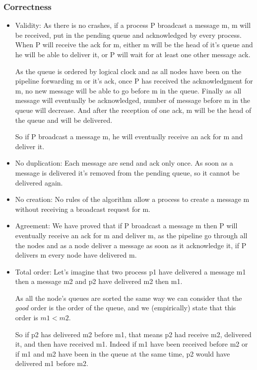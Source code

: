 \documentclass[a4paper]{article}
\begin{document}
\subsubsection*{Correctness}
\begin{itemize}
    \item Validity: As there  is no crashes, if a process P broadcast a
        message m, m will be received, put in the pending queue and acknowledged 
        by every process. When P will receive the ack for m, either m will be
        the head of it's queue and he will be able to deliver it, or P will wait
        for at least one other message ack. 
        
        As the queue is ordered by logical clock and as all nodes have been on
        the pipeline forwarding m or it's ack, once P has received the
        acknowledgment for m, no new message will be able to go before m in the
        queue. Finally as all message will eventually be acknowledged, number of
        message before m in the queue will decrease. And after the reception of
        one ack, m will be the head of the queue and will be delivered.

        So if P broadcast a message m, he will eventually receive an ack
        for m and deliver it.
    \item No duplication: Each message are send and ack only once. As soon as a
        message is delivered it's removed from the pending queue, so it cannot
        be delivered again.
    \item No creation: No rules of the algorithm allow a process to
        create a message m without receiving a broadcast request for m.
    \item Agreement: We have proved that if P broadcast a message m
        then P will eventually receive an ack for m and deliver m, as
        the pipeline go through all the nodes and as a node deliver a
        message as soon as it acknowledge it, if P delivers m every node
        have delivered m.
    \item Total order: Let's imagine that two process p1 have delivered a message m1 then a
        message m2 and p2 have delivered m2 then m1. 
        
        As all the node's queues are sorted the same way we can consider that
        the \textit{good} order is the order of the queue, and we (empirically)
        state that this order is $m1<m2$.

        So if p2 has delivered m2 before m1, that means p2 had receive m2,
        delivered it, and then have received m1. Indeed if m1 have been received
        before m2 or if m1 and m2 have been in the queue at the same time, p2
        would have delivered m1 before m2.


\end{itemize}
\end{document}
